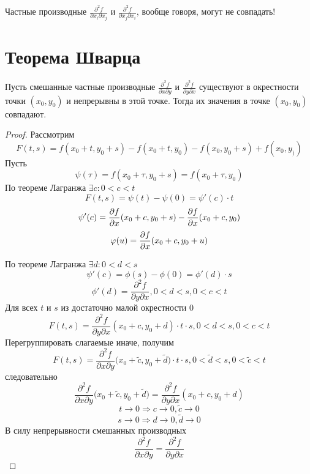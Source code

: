    \begin{mention}
    	Частные производные $\frac{\partial^2 f}{\partial x_i \partial x_j}$ и $\frac{\partial^2 f}{\partial x_j \partial x_i}$, вообще говоря, могут не совпадать!
    \end{mention}
    
    \section{Теорема Шварца}
    
    \begin{theorem}[Шварц]
    	Пусть смешанные частные производные $\frac{\partial^2 f}{\partial x \partial y}$ и $\frac{\partial^2 f}{\partial y \partial x}$ существуют в окрестности точки $(x_0, y_0)$ и непрерывны в этой точке. Тогда их значения в точке $(x_0, y_0)$ совпадают.
    \end{theorem}
    
    \begin{proof}
    	Рассмотрим
    	\[ F(t, s) = f(x_0 + t, y_0 + s) - f(x_0 + t, y_0) - f(x_0, y_0 + s) + f(x_0, y_)) \]
    	Пусть
    	\[ \psi(\tau) = f(x_0 + \tau, y_0 + s) = f(x_0 + \tau, y_0) \]
    	По теореме Лагранжа $\exists c: 0 < c < t$
    	\[ F(t, s) = \psi(t) - \psi(0) = \psi'(c) \cdot t \]
    	\[ \psi'(c) = \frac{\partial f}{\partial x}(x_0 + c, y_0 + s) - \frac{\partial f}{\partial x}(x_0 + c, y_0) \]
    	\[ \varphi(u) = \frac{\partial f}{\partial x}(x_0 + c, y_0 + u) \]
    	
    	По теореме Лагранжа $\exists d: 0 < d < s$
    	\[ \psi'(c) = \phi(s) - \phi(0) = \phi'(d) \cdot s \]
    	\[ \phi'(d) = \frac{\partial^2 f}{\partial y \partial x}, 0 < d < s, 0 < c < t \]
    	Для всех $t$ и $s$ из достаточно малой окрестности 0
    	\[ F(t, s) = \frac{\partial^2 f}{\partial y \partial x}(x_0 + c, y_0 + d) \cdot t \cdot s, 0 < d < s, 0 < c < t \]
    	Перегруппировать слагаемые иначе, получим
    	\[ F(t, s) = \frac{\partial^2 f}{\partial x \partial y} \big(x_0 + \widetilde{c}, y_0 + \widetilde{d} \big) \cdot t \cdot s, 0 < \widetilde{d} < s, 0 < \widetilde{c} < t \]
    	следовательно
    	\[ \frac{\partial^2 f}{\partial x \partial y} \big(x_0 + \widetilde{c}, y_0 + \widetilde{d} \big) = \frac{\partial^2 f}{\partial y \partial x} (x_0 + c, y_0 + d) \]
    	\[ t \to 0 \Rightarrow c \to 0, \widetilde{c} \to 0 \]
    	\[ s \to 0 \Rightarrow d \to 0, \widetilde{d} \to 0 \]
    	В силу непрерывности смешанных производных
    	\[ \frac{\partial^2 f}{\partial x \partial y} = \frac{\partial^2 f}{\partial y \partial x} \]
    \end{proof}

